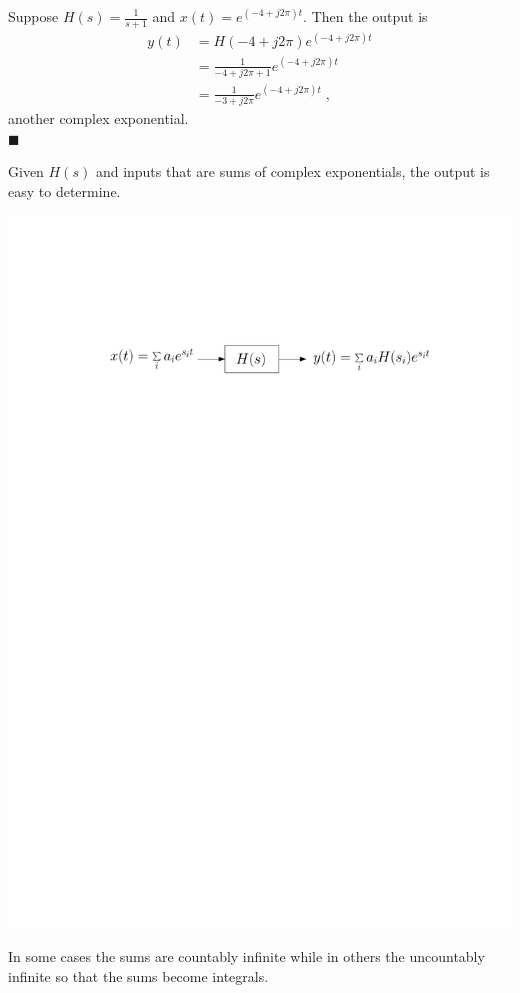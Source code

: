 \begin{example}
Suppose $H(s) = \frac{1}{s+1}$ and $x(t) = e^{(-4+j2\pi)t}$. Then the output is
\begin{align*}
  y(t) &= H(-4+j2\pi)e^{(-4+j2\pi)t}\\
  &= \frac{1}{-4+j2\pi+1}e^{(-4+j2\pi)t}\\
  &= \frac{1}{-3+j2\pi}e^{(-4+j2\pi)t} \; ,
\end{align*}
another complex exponential.\\
$\blacksquare$
\end{example}

Given $H(s)$ and inputs that are sums of complex exponentials, the output is easy to determine.

\begin{center}
  \includegraphics[scale=0.6]{graphics/ct-linear-response-complex-exp.pdf}
\end{center}
In some cases the sums are countably infinite while in others the uncountably infinite so that the sums become integrals.

